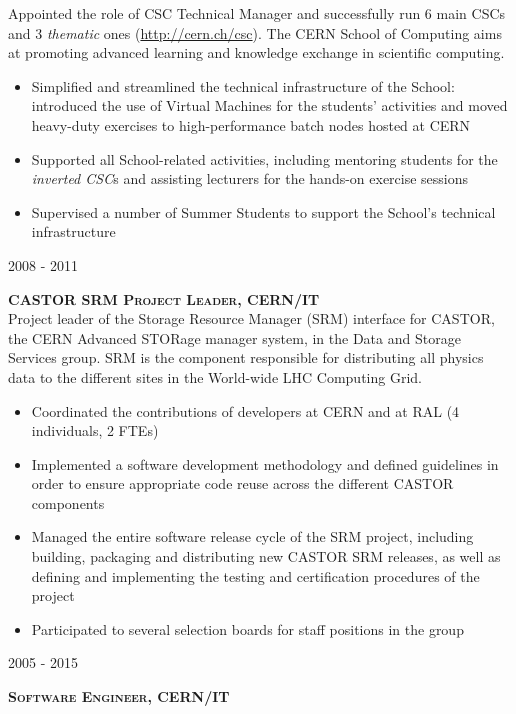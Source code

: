 \documentclass[11pt]{article}
\renewcommand{\subsection}[2]%
        {
         {\bf{\raggedright \scshape #1}}{\bf{\hfill \scshape #2}}\\[-.7\baselineskip]
}
\newenvironment{CompactItemize} {
  \begin{itemize}
  \setlength{\itemsep}{-3pt}
  \setlength{\parsep}{0pt}
  \setlength{\topsep}{-2pt}
  \setlength{\partopsep}{-2pt}
} {\end{itemize}}
\begin{document}
Appointed the role of CSC Technical Manager and successfully run 6 main CSCs and 3 \emph{thematic} ones
(\href{http://cern.ch/csc}{http://cern.ch/csc}). The CERN School of Computing aims at promoting
advanced learning and knowledge exchange in scientific computing.

\begin{CompactItemize}
\item Simplified and streamlined the technical infrastructure of the School: introduced
      the use of Virtual Machines for the students' activities and moved heavy-duty exercises to
      high-performance batch nodes hosted at CERN
\item Supported all School-related activities, including mentoring students for the \emph{inverted CSC}s
      and assisting lecturers for the hands-on exercise sessions
\item Supervised a number of Summer Students to support the School's technical infrastructure
\end{CompactItemize}

\subsection{2008 - 2011}{CASTOR SRM Project Leader, CERN/IT}

Project leader of the Storage Resource Manager (SRM) interface for CASTOR, the CERN Advanced STORage
manager system, in the Data and Storage Services group.
SRM is the component responsible for distributing all physics data to the different sites
in the World-wide LHC Computing Grid.

\begin{CompactItemize}
\item Coordinated the contributions of developers at CERN and at RAL (4 individuals, 2 FTEs)
\item Implemented a software development methodology and defined guidelines in order to ensure
  appropriate code reuse across the different CASTOR components
\item Managed the entire software release cycle of the SRM project, including building, packaging and distributing
  new CASTOR SRM releases, as well as defining and implementing the testing and certification procedures
  of the project
\item Participated to several selection boards for staff positions in the group
\end{CompactItemize}

\subsection{2005 - 2015}{Software Engineer, CERN/IT}
\end{document}
